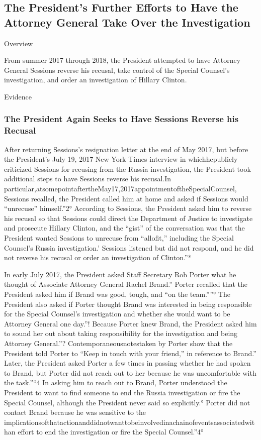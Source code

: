 \subsection{The President's Further Efforts to Have the Attorney General Take Over the Investigation}

Overview

From summer 2017 through 2018, the President attempted to have Attorney General Sessions reverse his recusal, take control of the Special Counsel's investigation, and order an investigation of Hillary Clinton.

Evidence

\subsubsection{The President Again Seeks to Have Sessions Reverse his Recusal}

After returning Sessions's resignation letter at the end of May 2017, but before the President's July 19, 2017 New York Times interview in whichhepublicly criticized Sessions for recusing from the Russia investigation, the President took additional steps to have Sessions reverse his recusal.In particular,atsomepointaftertheMay17,2017appointmentoftheSpecialCounsel, Sessions recalled, the President called him at home and asked if Sessions would “unrecuse” himself.”2° According to Sessions, the President asked him to reverse his recusal so that Sessions could direct the Department of Justice to investigate and prosecute Hillary Clinton, and the “gist” of the conversation was that the President wanted Sessions to unrecuse from “allofit,” including the Special Counsel's Russia investigation.' Sessions listened but did not respond, and he did not reverse his recusal or order an investigation of Clinton.”*

In early July 2017, the President asked Staff Secretary Rob Porter what he thought of Associate Attorney General Rachel Brand.” Porter recalled that the President asked him if Brand was good, tough, and “on the team.””° The President also asked if Porter thought Brand was interested in being responsible for the Special Counsel's investigation and whether she would want to be Attorney General one day.”! Because Porter knew Brand, the President asked him to sound her out about taking responsibility for the investigation and being Attorney General.”? Contemporaneousnotestaken by Porter show that the President told Porter to “Keep in touch with your friend,” in reference to Brand.” Later, the President asked Porter a few times in passing whether he had spoken to Brand, but Porter did not reach out to her because he was uncomfortable with the task.”“4 In asking him to reach out to Brand, Porter understood the President to want to find someone to end the Russia investigation or fire the Special Counsel, although the President never said so explicitly.° Porter did not contact Brand because he was sensitive to the implicationsofthatactionanddidnotwanttobeinvolvedinachainofeventsassociatedwithan effort to end the investigation or fire the Special Counsel.”4°

